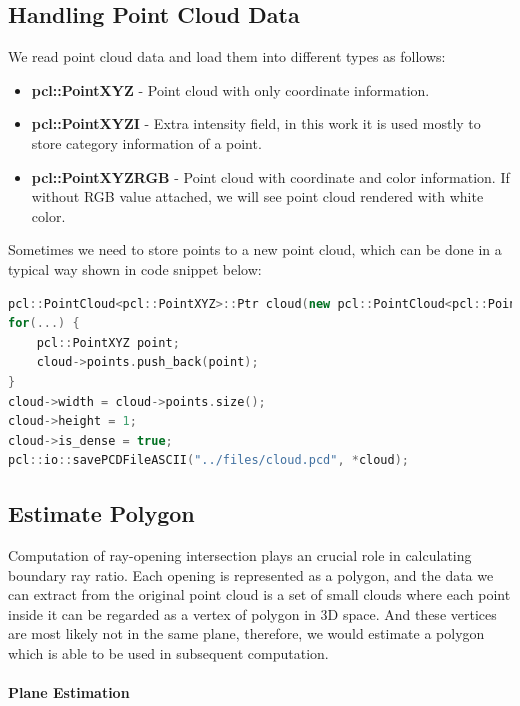 \documentclass[11pt, a4paper,oneside,chapterprefix=false]{scrbook}
\begin{document}
\subsection{Handling Point Cloud Data}

We read point cloud data and load them into different types as follows:

\begin{itemize}
    \item \textbf{pcl::PointXYZ} - Point cloud with only coordinate information.
    \item \textbf{pcl::PointXYZI} - Extra intensity field, in this work it is used mostly to store category information of a point.
    \item \textbf{pcl::PointXYZRGB} - Point cloud with coordinate and color information. If without RGB value attached, we will see point cloud rendered with white color.
\end{itemize}

Sometimes we need to store points to a new point cloud, which can be done in a typical way shown in code snippet below:

\begin{lstlisting}[language=C++, caption=Save Point Cloud Data]
pcl::PointCloud<pcl::PointXYZ>::Ptr cloud(new pcl::PointCloud<pcl::PointXYZ>);
for(...) {
    pcl::PointXYZ point;
    cloud->points.push_back(point);
}
cloud->width = cloud->points.size();
cloud->height = 1;
cloud->is_dense = true;
pcl::io::savePCDFileASCII("../files/cloud.pcd", *cloud);
\end{lstlisting}

\subsection{Estimate Polygon}

Computation of ray-opening intersection plays an crucial role in calculating boundary ray ratio. Each opening is represented as a polygon, and the data we can extract from the original point cloud is a set of small clouds where each point inside it can be regarded as a vertex of polygon in 3D space. And these vertices are most likely not in the same plane, therefore, we would estimate a polygon which is able to be used in subsequent computation. 

\paragraph{Plane Estimation}
\end{document}
